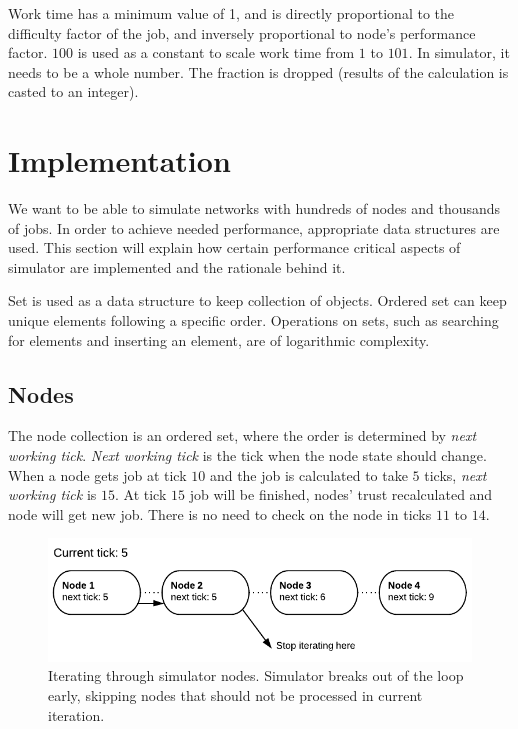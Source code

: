 Work time has a minimum value of 1, and is directly proportional to the difficulty factor of the job, and inversely proportional to node's performance factor. $100$ is used as a constant to scale work time from $1$ to $101$. In simulator, it needs to be a whole number. The fraction is dropped (results of the calculation is casted to an integer).

\section{Implementation}

We want to be able to simulate networks with hundreds of nodes and thousands of jobs. In order to achieve needed performance, appropriate data structures are used. This section will explain how certain performance critical aspects of simulator are implemented and the rationale behind it.

Set is used as a data structure to keep collection of objects. Ordered set can keep unique elements following a specific order. Operations on sets, such as searching for elements and inserting an element, are of logarithmic complexity.

\subsection{Nodes}

The node collection is an ordered set, where the order is determined by \emph{next working tick}. \emph{Next working tick} is the tick when the node state should change. When a node gets job at tick $10$ and the job is calculated to take $5$ ticks, \emph{next working tick} is $15$. At tick $15$ job will be finished, nodes' trust recalculated and node will get new job. There is no need to check on the node in ticks $11$ to $14$.

\begin{figure}
\centering
\includegraphics{diagrams/SimulatorNodes.pdf}
\caption{Iterating through simulator nodes. Simulator breaks out of the loop early, skipping nodes that should not be processed in current iteration.}
\label{f:simnodes}
\end{figure}


